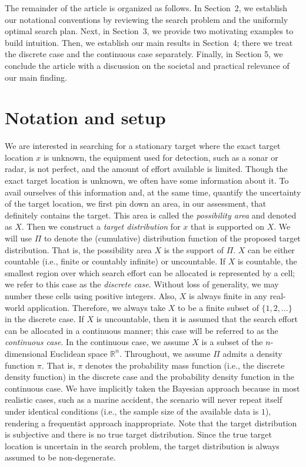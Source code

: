 \documentclass[12pt]{article}
\theoremstyle{plain}
\theoremstyle{definition}
\theoremstyle{remark}
\begin{document}
The remainder of the article is organized as follows.  In Section~2, we establish our notational conventions by reviewing the search problem and the uniformly optimal search plan.  Next, in Section~3, we provide two motivating examples to build intuition.  Then, we establish our main results in Section~4; there we treat the discrete case and the continuous case separately.  Finally,  in Section 5,  we conclude the article with a discussion on the societal and practical relevance of our main finding.


\section{Notation and setup}

We are interested in searching for a stationary target where the exact target location $x$ is unknown,  the equipment used for detection, such as a sonar or radar, is not perfect, and the amount of effort available is limited.  Though the exact target location is unknown,  we often have some information about it. To avail ourselves of this information and, at the same time, quantify the uncertainty of the target location, we first pin down an area, in our assessment,  that definitely contains the target.  This area is called the \emph{possibility area} and denoted as $X$.  Then we construct a \emph{target distribution} for $x$ that is supported on $X$.  We will use $\Pi$ to denote the (cumulative) distribution function of the proposed target distribution.  That is, the possibility area $X$ is the support of $\Pi$.  $X$ can be either countable (i.e., finite or countably infinite) or uncountable.  If $X$ is countable,  the smallest region over which search effort can be allocated is represented by a cell; we refer to this case as the \emph{discrete case}.  Without loss of generality, we may number these cells using positive integers.  Also, $X$ is always finite in any real-world application.  Therefore,  we always take $X$ to be a finite subset of $\{1, 2, \ldots\}$ in the discrete case.  If $X$ is uncountable, then it is assumed that the search effort can be allocated in a continuous manner; this case will be referred to as the \emph{continuous case}.  In the continuous case,  we assume $X$ is a subset of the $n$-dimensional Euclidean space $\mathbb{R}^n$.  Throughout, we assume  $\Pi$ admits a  density function $\pi$.  That is, $\pi$ denotes the probability mass function (i.e.,  the discrete density function) in the discrete case and the probability density function in the continuous case.  We have implicitly taken the Bayesian approach because in most realistic cases, such as a marine accident,  the scenario will never repeat itself under identical conditions (i.e., the sample size of the available data is $1$), rendering a frequentist approach inappropriate.  Note that the target distribution is subjective and there is no true target distribution.  Since the true target location is uncertain in the search problem,  the target distribution is always assumed to be non-degenerate. 
\end{document}
